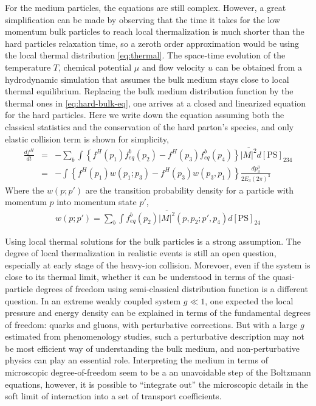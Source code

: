 For the medium particles, the equations are still complex.
However, a great simplification can be made by observing that the time it takes for the low momentum bulk particles to reach local thermalization is much shorter than the hard particles relaxation time, so a zeroth order approximation would be using the local thermal distribution \ref{eq:thermal}.
The space-time evolution of the temperature $T$, chemical potential $\mu$ and flow velocity $u$ can be obtained from a hydrodynamic simulation that assumes the bulk medium stays close to local thermal equilibrium.
Replacing the bulk medium distribution function by the thermal ones in \ref{eq:hard-bulk-eq}, one arrives at a closed and linearized equation for the hard particles.
Here we write down the equation assuming both the classical statistics and the conservation of the hard parton's species, and only elastic collision term is shown for simplicity,
\begin{eqnarray}
\frac{df^H}{dt} &=& -\sum_{b} \int \left\{
f^H(p_1)f^b_{eq}(p_2) - f^H(p_3)f^b_{eq}(p_4)\right\}
\overline{|M|^2} d[\textrm{PS}]_{234} \\
&=& - \int \left\{
f^H(p_1) w(p_1; p_3) - f^H(p_3) w(p_3, p_1)\right\}\frac{dp_3^3}{2E_3 (2\pi)^3}
\end{eqnarray}
Where the $w(p; p')$ are the transition probability density for a particle with momentum $p$ into momentum state $p'$,
\begin{eqnarray}
w(p; p') = \sum_b\int f_{eq}^b(p_2) \overline{|M|^2}(p, p_2; p', p_4) d[\textrm{PS}]_{24}
\end{eqnarray}

Using local thermal solutions for the bulk particles is a strong assumption. 
The degree of local thermalization in realistic events is still an open question, especially at early stage of the heavy-ion collision. 
Morevoer, even if the system is close to its thermal limit, whether it can be understood in terms of the quasi-particle degrees of freedom using semi-classical distribution function is a different question.
In an extreme weakly coupled system $g\ll 1$, one expected the local pressure and energy density can be explained in terms of the fundamental degrees of freedom: quarks and gluons, with perturbative corrections.
But with a large $g$ estimated from phenomenology studies, such a perturbative description may not be most efficient way of understanding the bulk medium, and non-perturbative physics can play an essential role. 
Interpreting the medium in terms of microscopic degree-of-freedom seem to be a an unavoidable step of the Boltzmann equations, however, it is possible to ``integrate out'' the microscopic details in the soft limit of interaction into a set of transport coefficients.

